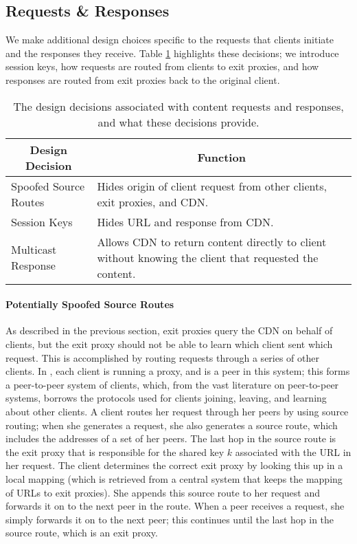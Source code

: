 \subsection{Requests \& Responses}
We make additional design choices specific to the requests that clients initiate and 
the responses they receive.  Table \ref{tab:request_response} highlights these decisions; we 
introduce session keys, how requests are routed from clients to exit proxies, and how responses 
are routed from exit proxies back to the original client.

\begin{table}[t!]
\footnotesize
\centering
\begin{tabular}{ l  p{1.95in} } 
 \multicolumn{1}{c}{\bf Design Decision} & \multicolumn{1}{c}{\bf Function} \\
\hline \hline
Spoofed Source Routes & {Hides origin of client request from other
 clients, exit proxies, and CDN.} \\
 Session Keys & {Hides URL and response from CDN.} \\
 Multicast Response & {Allows CDN to return content directly to client without knowing
 the client that requested the content.} \\
 \hline
\end{tabular}
\caption{The design decisions associated with content requests and responses, and what these 
decisions provide.}
\label{tab:request_response}
\end{table}

\paragraph{Potentially Spoofed Source Routes}
As described in the previous section, exit proxies query the CDN on behalf of clients, but the exit proxy 
should not be able to learn which client sent which request.  This is accomplished by routing requests through 
a series of other clients.  In \system{}, each client is running a proxy, and is a peer in this system; this 
forms a peer-to-peer system of clients, which, from the vast literature on peer-to-peer systems, borrows the 
protocols used for clients joining, leaving, and learning about other clients. A client routes her request through 
her peers by using source routing; when she generates a request, she also generates a source route, which includes 
the addresses of a set of her peers.  The last hop in the source route is the exit proxy that is responsible for the 
shared key $k$ associated with the URL in her request.  The client determines the correct exit proxy by looking this 
up in a local mapping (which is retrieved from a central system that keeps the mapping of URLs to exit proxies).  
She appends this source route to her request and forwards it on to the next peer in the route.  When a peer receives 
a request, she simply forwards it on to the next peer; this continues until the last hop in the source route, which 
is an exit proxy. 

